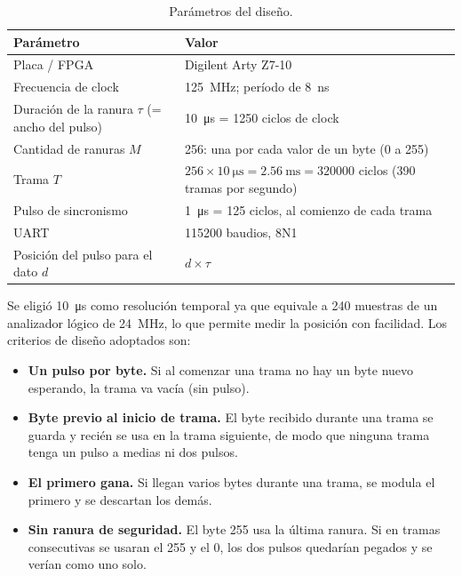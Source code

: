 \documentclass[11pt,a4paper]{article}
\begin{document}
\begin{table}[H]
\centering
\small
\renewcommand{\arraystretch}{0.9}
\caption{Parámetros del diseño.}
\label{tab:parametros}
\begin{tabularx}{\linewidth}{@{}l X@{}}
\toprule
\textbf{Parámetro} & \textbf{Valor} \\
\midrule
Placa / FPGA & Digilent Arty Z7-10 \\
Frecuencia de clock & \SI{125}{\mega\hertz}; período de \SI{8}{\nano\second} \\
Duración de la ranura $\tau$ (= ancho del pulso) & \SI{10}{\micro\second} = 1250 ciclos de clock \\
Cantidad de ranuras $M$ & 256: una por cada valor de un byte (0 a 255) \\
Trama $T$ & $256 \times \SI{10}{\micro\second} = \SI{2,56}{\milli\second} = \num{320000}$ ciclos (390 tramas por segundo) \\
Pulso de sincronismo & \SI{1}{\micro\second} = 125 ciclos, al comienzo de cada trama \\
UART & \num{115200} baudios, 8N1 \\
Posición del pulso para el dato $d$ &  $ d \times \tau $ \\
\bottomrule
\end{tabularx}
\end{table}

Se eligió \SI{10}{\micro\second} como resolución temporal ya que equivale a 240 muestras de un analizador
lógico de \SI{24}{\mega\hertz}, lo que permite medir la posición con facilidad. Los criterios de diseño adoptados son:

\begin{itemize}
  \item \textbf{Un pulso por byte.} Si al comenzar una trama no hay un byte nuevo esperando, la trama va vacía (sin pulso).
  \item \textbf{Byte previo al inicio de trama.} El byte recibido durante una trama se guarda y recién se usa en la trama siguiente, de modo que ninguna trama tenga un pulso a medias ni dos pulsos.
  \item \textbf{El primero gana.} Si llegan varios bytes durante una trama, se modula el primero y se descartan los demás.
  \item \textbf{Sin ranura de seguridad.} El byte 255 usa la última ranura. Si en tramas consecutivas se usaran el 255 y el 0, los dos pulsos quedarían pegados y se verían como uno solo.
\end{itemize}
\end{document}
